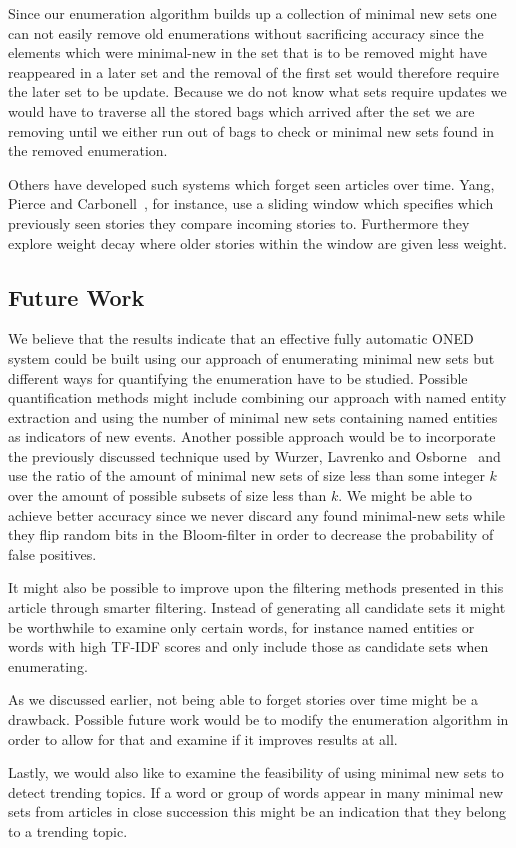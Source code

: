 Since our enumeration algorithm builds up a collection of minimal new sets one can not easily remove old enumerations without sacrificing accuracy since the elements which were minimal-new in the set that is to be removed might have reappeared in a later set and the removal of the first set would therefore require the later set to be update. Because we do not know what sets require updates we would have to traverse all the stored bags which arrived after the set we are removing until we either run out of bags to check or minimal new sets found in the removed enumeration.

Others have developed such systems which forget seen articles over time. Yang, Pierce and Carbonell~\cite{yang1998study}, for instance, use a sliding window which specifies which previously seen stories they compare incoming stories to. Furthermore they explore weight decay where older stories within the window are given less weight.

\subsection{Future Work}
We believe that the results indicate that an effective fully automatic ONED system could be built using our approach of enumerating minimal new sets but different ways for quantifying the enumeration have to be studied. Possible quantification methods might include combining our approach with named entity extraction and using the number of minimal new sets containing named entities as indicators of new events. Another possible approach would be to incorporate the previously discussed technique used by Wurzer, Lavrenko and Osborne~\cite{wurzer2015kterm} and use the ratio of the amount of minimal new sets of size less than some integer $k$ over the amount of possible subsets of size less than $k$. We might be able to achieve better accuracy since we never discard any found minimal-new sets while they flip random bits in the Bloom-filter in order to decrease the probability of false positives.

It might also be possible to improve upon the filtering methods presented in this article through smarter filtering. Instead of generating all candidate sets it might be worthwhile to examine only certain words, for instance named entities or words with high TF-IDF scores and only include those as candidate sets when enumerating.

As we discussed earlier, not being able to forget stories over time might be a drawback. Possible future work would be to modify the enumeration algorithm in order to allow for that and examine if it improves results at all.

Lastly, we would also like to examine the feasibility of using minimal new sets to detect trending topics. If a word or group of words appear in many minimal new sets from articles in close succession this might be an indication that they belong to a trending topic.
